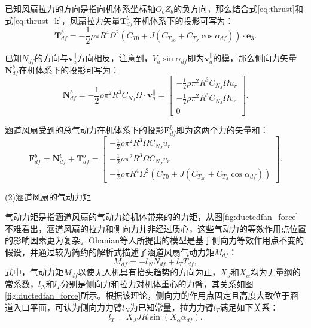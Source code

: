 已知风扇拉力的方向是指向机体系坐标轴$O_bZ_b$的负方向，那么结合式\eqref{eq:thrust}和式\eqref{eq:thrust_k}，风扇拉力矢量$\boldsymbol{T}_{df}^b$在机体系下的投影可写为：
\begin{equation}
    \boldsymbol{T}_{df}^b = -\frac{1}{2}\rho \pi R^4 \Omega^2 (C_{T0} + J (C_{T_{J0}} + C_{T_J} \cos\alpha_{df})) \cdot \boldsymbol{e}_3.
    \label{eq:T_df}
\end{equation}

已知$N_{df}$的方向与$\boldsymbol{v}_a^{||}$方向相反，注意到，$V_a \sin\alpha_{df}$即为$\boldsymbol{v}_a^{||}$的模，那么侧向力矢量$\boldsymbol{N}_{df}^b$在机体系下的投影可写为：
\begin{equation}
    \boldsymbol{N}_{df}^b = -\frac{1}{2}\rho \pi^2 R^3 C_{N_J} \Omega \cdot \boldsymbol{v}_a^{||} = 
    \begin{bmatrix}
        -\frac{1}{2}\rho \pi^2 R^3 C_{N_J} \Omega u_r \\
        -\frac{1}{2}\rho \pi^2 R^3 C_{N_J} \Omega v_r \\
        0
    \end{bmatrix}.
    \label{eq:N_df}
\end{equation}

涵道风扇受到的总气动力在机体系下的投影$\boldsymbol{F}_{df}^b$即为这两个力的矢量和：
\begin{equation}
    \boldsymbol{F}_{df}^b = \boldsymbol{N}_{df}^b + \boldsymbol{T}_{df}^b =
    \begin{bmatrix}
        -\frac{1}{2}\rho \pi^2 R^3 \Omega C_{N_J} u_r \\
        -\frac{1}{2}\rho \pi^2 R^3 \Omega C_{N_J} v_r \\
        -\frac{1}{2}\rho \pi R^4 \Omega^2 (C_{T0} + J (C_{T_{J0}} + C_{T_J} \cos\alpha_{df}))
    \end{bmatrix}.
\end{equation}

(2)涵道风扇的气动力矩

气动力矩是指涵道风扇的气动力给机体带来的的力矩，从图\ref{fig:ductedfan_force}不难看出，涵道风扇的拉力和侧向力并非经过质心，这些气动力的等效作用点位置的影响因素更为复杂。Ohanian等人所提出的模型是基于侧向力等效作用点不变的假设\cite{2012Nondimensional}，并通过较为简约的解析式描述了涵道风扇气动力矩$M_{df}$：
\begin{equation}
    M_{df} = -l_N N_{df} + l_T T_{df},
\end{equation}
式中，气动力矩$M_{df}$以使无人机具有抬头趋势的方向为正，$X_J$和$X_{\alpha}$均为无量纲的常系数，$l_N$和$l_T$分别是侧向力和拉力对机体重心的力臂，其关系如图\ref{fig:ductedfan_force}所示。根据该理论，侧向力的作用点固定且高度大致位于涵道入口平面，可认为侧向力力臂$l_N$为已知常量，拉力力臂$l_T$满足如下关系：
\begin{equation}
    l_T = X_J J R \sin(X_\alpha \alpha_{df}).
    \label{eq:l__T}
\end{equation}

